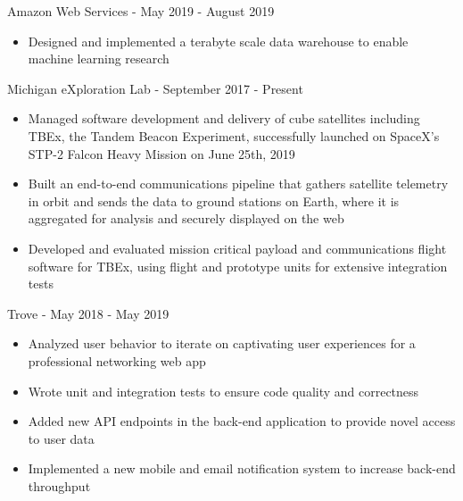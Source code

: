 \documentclass[]{template}
\begin{document}
\begin{entrylist}

\entry
{Amazon Web Services - }
{May 2019 - August 2019}
{
\vspace{-10.5pt}
\begin{itemize}[leftmargin=10pt, itemsep=-9pt, topsep=2pt]
    \item Designed and implemented a terabyte scale data warehouse to enable machine learning research
\end{itemize}
}
    

\entry
{Michigan eXploration Lab  - }
{September 2017 - Present}
{
\vspace{-10.5pt}
\begin{itemize}[leftmargin=10pt, itemsep=-9pt, topsep=2pt]
    \item Managed software development and delivery of cube satellites including TBEx, the Tandem Beacon Experiment, successfully launched on SpaceX's STP-2 Falcon Heavy Mission on June 25th, 2019\\
    \item Built an end-to-end communications pipeline that gathers satellite telemetry in orbit and sends the data to ground stations on Earth, where it is aggregated for analysis and securely displayed on the web\\
    \item Developed and evaluated mission critical payload and communications flight software for TBEx, using flight and prototype units for extensive integration tests
\end{itemize}
}


\entry
{Trove - }
{May 2018 - May 2019}
{
\vspace{-10.5pt}
\begin{itemize}[leftmargin=10pt, itemsep=-9pt, topsep=2pt]
    \item Analyzed user behavior to iterate on captivating user experiences for a professional networking web app\\
    \item Wrote unit and integration tests to ensure code quality and correctness\\
    \item Added new API endpoints in the back-end application to provide novel access to user data\\
    \item Implemented a new mobile and email notification system to increase back-end throughput
\end{itemize}
}


\end{entrylist}
\end{document}
